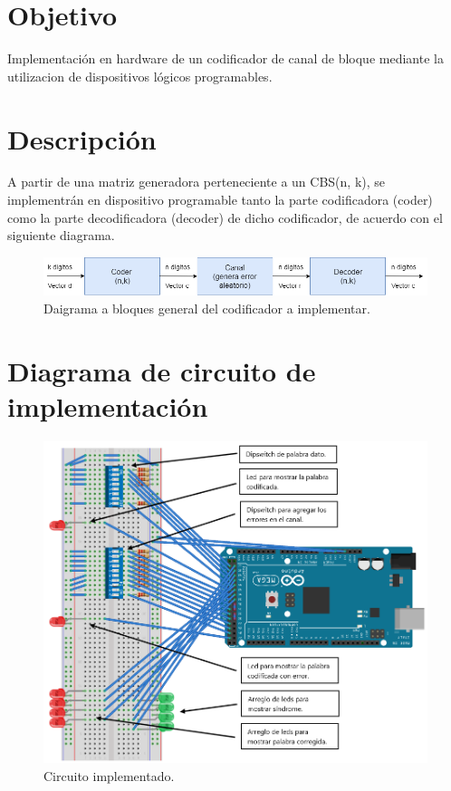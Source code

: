 \documentclass[12pt,letterpaper]{article}
\begin{document}

\newpage
\tableofcontents
\listoffigures

\newpage
\section{Objetivo}
Implementación en hardware de un codificador de canal de bloque mediante la utilizacion 
de dispositivos lógicos programables.

\section{Descripción}
A partir de una matriz generadora perteneciente a un CBS(n, k), se implementrán en dispositivo 
programable tanto la parte codificadora (coder) como la parte decodificadora (decoder) de dicho
codificador, de acuerdo con el siguiente diagrama.
\begin{figure}[ht]
    \centering
    \includegraphics[width=1\textwidth]{d0.png}
    \caption{Daigrama a bloques general del codificador a implementar.}
\end{figure}

\newpage
\section{Diagrama de circuito de implementación}
\begin{figure}[ht]
    \centering
    \includegraphics[width=.75\textwidth]{circ.png}
    \caption{Circuito implementado.}
\end{figure}
\end{document}
